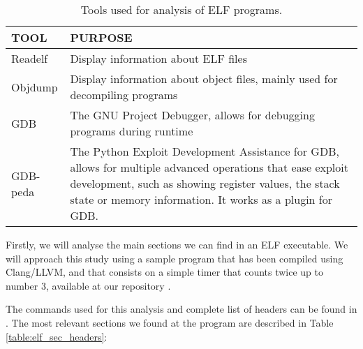 \begin{table}[htbp]
\begin{tabular}{|>{\centering\arraybackslash}p{3cm}|>{\centering\arraybackslash}p{10cm}|}
\hline
\textbf{TOOL} & \textbf{PURPOSE}\\
\hline
\hline
Readelf & Display information about ELF files\\
\hline
Objdump & Display information about object files, mainly used for decompiling programs\\
\hline
GDB & The GNU Project Debugger, allows for debugging programs during runtime\\
\hline
GDB-peda & The Python Exploit Development Assistance for GDB, allows for multiple advanced operations that ease exploit development, such as showing register values, the stack state or memory information. It works as a plugin for GDB.\\
\hline
\end{tabular}
\caption{Tools used for analysis of ELF programs.}
\label{table:elf_tools}
\end{table}

Firstly, we will analyse the main sections we can find in an ELF executable. We will approach this study using a sample program that has been compiled using Clang/LLVM, and that consists on a simple timer that counts twice up to number 3, available at our repository \cite{repo_simple_timer}.

The commands used for this analysis and complete list of headers can be found in . The most relevant sections we found at the program are described in Table \ref{table:elf_sec_headers}:

